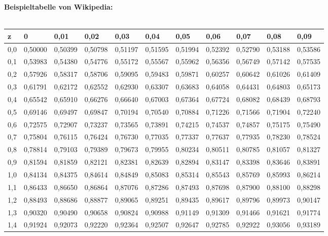 \documentclass[12pt,a4paper]{article}
\begin{document}
\textbf{Beispieltabelle von Wikipedia:}
 \\
 \\
\begin{tabular}{l|l|l|l|l|l|l|l|l|l|l}
z & 0 & 0,01 & 0,02 & 0,03 & 0,04 & 0,05 & 0,06 & 0,07 & 0,08 & 0,09\\ \hline
0,0 & 0,50000 & 0,50399 & 0,50798 & 0,51197 & 0,51595 & 0,51994 & 0,52392 & 0,52790 & 0,53188 & 0,53586\\ \hline
0,1 & 0,53983 & 0,54380 & 0,54776 & 0,55172 & 0,55567 & 0,55962 & 0,56356 & 0,56749 & 0,57142 & 0,57535\\ \hline
0,2 & 0,57926 & 0,58317 & 0,58706 & 0,59095 & 0,59483 & 0,59871 & 0,60257 & 0,60642 & 0,61026 & 0,61409\\ \hline
0,3 & 0,61791 & 0,62172 & 0,62552 & 0,62930 & 0,63307 & 0,63683 & 0,64058 & 0,64431 & 0,64803 & 0,65173\\ \hline
0,4 & 0,65542 & 0,65910 & 0,66276 & 0,66640 & 0,67003 & 0,67364 & 0,67724 & 0,68082 & 0,68439 & 0,68793\\ \hline
0,5 & 0,69146 & 0,69497 & 0,69847 & 0,70194 & 0,70540 & 0,70884 & 0,71226 & 0,71566 & 0,71904 & 0,72240\\ \hline
0,6 & 0,72575 & 0,72907 & 0,73237 & 0,73565 & 0,73891 & 0,74215 & 0,74537 & 0,74857 & 0,75175 & 0,75490\\ \hline
0,7 & 0,75804 & 0,76115 & 0,76424 & 0,76730 & 0,77035 & 0,77337 & 0,77637 & 0,77935 & 0,78230 & 0,78524\\ \hline
0,8 & 0,78814 & 0,79103 & 0,79389 & 0,79673 & 0,79955 & 0,80234 & 0,80511 & 0,80785 & 0,81057 & 0,81327\\ \hline
0,9 & 0,81594 & 0,81859 & 0,82121 & 0,82381 & 0,82639 & 0,82894 & 0,83147 & 0,83398 & 0,83646 & 0,83891\\ \hline
1,0 & 0,84134 & 0,84375 & 0,84614 & 0,84849 & 0,85083 & 0,85314 & 0,85543 & 0,85769 & 0,85993 & 0,86214\\ \hline
1,1 & 0,86433 & 0,86650 & 0,86864 & 0,87076 & 0,87286 & 0,87493 & 0,87698 & 0,87900 & 0,88100 & 0,88298\\ \hline
1,2 & 0,88493 & 0,88686 & 0,88877 & 0,89065 & 0,89251 & 0,89435 & 0,89617 & 0,89796 & 0,89973 & 0,90147\\ \hline
1,3 & 0,90320 & 0,90490 & 0,90658 & 0,90824 & 0,90988 & 0,91149 & 0,91309 & 0,91466 & 0,91621 & 0,91774\\ \hline
1,4 & 0,91924 & 0,92073 & 0,92220 & 0,92364 & 0,92507 & 0,92647 & 0,92785 & 0,92922 & 0,93056 & 0,93189\\ \hline

\end{tabular}
\end{document}
